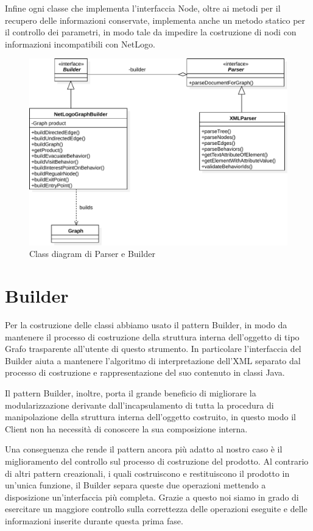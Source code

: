 Infine ogni classe che implementa l'interfaccia Node, oltre ai metodi per il recupero delle informazioni conservate, implementa anche un metodo statico per il controllo dei parametri, in modo tale da impedire la costruzione di nodi con informazioni incompatibili con NetLogo.

%
\begin{figure}[htbp]
\centering
\includegraphics[width=\textwidth,height=\textheight,keepaspectratio]{images/builder-diagram.pdf}
\caption{Class diagram di Parser e Builder}
\label{fig:builder-diagram}
\end{figure}
\section{Builder}
\label{sec:builder}
Per la costruzione delle classi abbiamo usato il pattern Builder, in modo da mantenere il processo di costruzione della struttura interna dell'oggetto di tipo Grafo trasparente all'utente di questo strumento. In particolare l'interfaccia del Builder aiuta a mantenere l'algoritmo di interpretazione dell'XML separato dal processo di costruzione e rappresentazione del suo contenuto in classi Java.

Il pattern Builder, inoltre, porta il grande beneficio di migliorare la modularizzazione derivante dall'incapsulamento di tutta la procedura di manipolazione della struttura interna dell'oggetto costruito, in questo modo il Client non ha necessità di conoscere la sua composizione interna. 

Una conseguenza che rende il pattern ancora più adatto al nostro caso è il miglioramento del controllo sul processo di costruzione del prodotto. Al contrario di altri pattern creazionali, i quali costruiscono e restituiscono il prodotto in un'unica funzione, il Builder separa queste due operazioni mettendo a disposizione un'interfaccia più completa. Grazie a questo noi siamo in grado di esercitare un maggiore controllo sulla correttezza delle operazioni eseguite e delle informazioni inserite durante questa prima fase.

